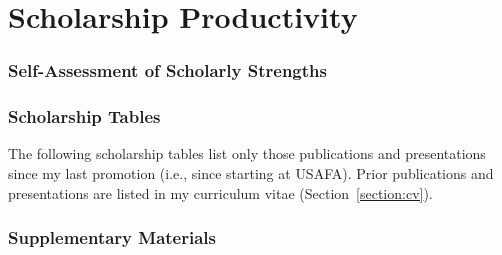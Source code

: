 \documentclass[11pt,titlepage]{article}
\begin{document}
\part{Scholarship Productivity}\label{section:scholarship}

\section{Self-Assessment of Scholarly Strengths}


\section{Scholarship Tables}
The following scholarship tables list only those publications and presentations since my last promotion (i.e., since starting at \gls{USAFA}).
Prior publications and presentations are listed in my curriculum vitae (Section~\ref{section:cv}).



\section{Supplementary Materials}
\end{document}
